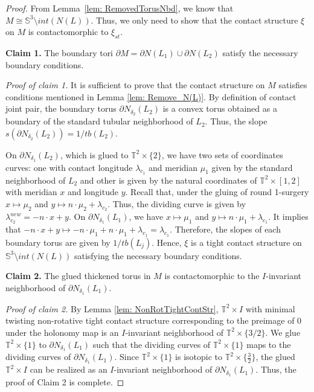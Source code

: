 \documentclass{amsart}
\theoremstyle{plain}
\theoremstyle{remark}
\theoremstyle{definition}
\newcommand{\s}{\mathbb{S}}
\newcommand{\dd}{\partial}
\begin{document}
\begin{proof}
    From Lemma~\ref{lem: RemovedTorusNbd}, we know that $M \cong \s^3 \setminus int(N(L))$. 
    Thus, we only need to show that the contact structure $\xi$ on $M$ is contactomorphic to $\xi_{st}$. 
  
    
    {\bf Claim 1.} The boundary tori $\dd M = \dd N(L_{1}) \cup \dd N(L_{2})$ satisfy the necessary boundary conditions.
    
    {\it Proof of claim 1.} It is sufficient to prove that the contact structure on $M$ satisfies conditions mentioned in Lemma \ref{lem: Remove_N(L)}.
    By definition of contact joint pair, the boundary torus $\dd N_{\delta_2}(L_{2})$ is a convex torus obtained as a boundary of the standard tubular neighborhood of $L_{2}$. 
    Thus, the slope $s(\dd N_{\delta_2}(L_{2}))= 1/tb(L_{2})$. 

    On $\dd N_{\delta_1}(L_{2})$, which is glued to $\mathbb{T}^2 \times \{2\}$, we have two sets of coordinates curves: one with contact longitude  $\lambda_{c_1}$ and meridian $\mu_1$ given by the standard neighborhood of $L_{2}$ and other is given by the natural coordinates of $\mathbb{T}^2 \times [1,2]$ with meridian $x$ and longitude $y$.
    Recall that, under the gluing of round 1-surgery $x \mapsto \mu_2$ and $y \mapsto n\cdot \mu_2 + \lambda_{c_2}$. Thus, the dividing curve is given by $\lambda_{c_2}^{new}= -n\cdot x +y$. 
    On $\dd N_{\delta_1}(L_{1})$, we have $x \mapsto \mu_1$ and $y \mapsto n\cdot \mu_1 + \lambda_{c_1}$. 
    It implies that $-n\cdot x + y \mapsto - n\cdot\mu_1 + n\cdot \mu_1 + \lambda_{c_1}= \lambda_{c_1}$. 
    Therefore, the slopes of each boundary torus are given by $1/tb(L_{j})$. 
    Hence, $\xi$ is a tight contact structure on $\s^3\setminus int(N(L))$ satisfying the necessary boundary conditions. 

{\bf Claim 2.} The glued thickened torus in $M$ is contactomorphic to the $I$-invariant neighborhood of $\dd N_{\delta_1}(L_{1})$. 

{\it Proof of claim 2.} %
By Lemma \ref{lem: NonRotTightContStr}, $\mathbb{T}^2 \times I$ with minimal twisting non-rotative tight contact structure corresponding to the preimage of $0$ under the holonomy map is an $I$-invariant neighborhood of  $\mathbb{T}^2 \times \{3/2\}$. 
We glue $\mathbb{T}^2\times \{1\}$ to $\dd N_{\delta_1}(L_{1})$ such that the dividing curves of $\mathbb{T}^2\times \{1\}$ maps to the dividing curves of $\dd N_{\delta_1}(L_{1})$. 
Since $\mathbb{T}^2 \times \{1\}$ is isotopic to $\mathbb{T}^2 \times \{\frac{3}{2}\}$, the glued $\mathbb{T}^2 \times I$ can be realized as an $I$-invariant neighborhood of $\dd N_{\delta_1}(L_{1})$. 
Thus, the proof of Claim 2 is complete. 


\end{proof}
\end{document}
